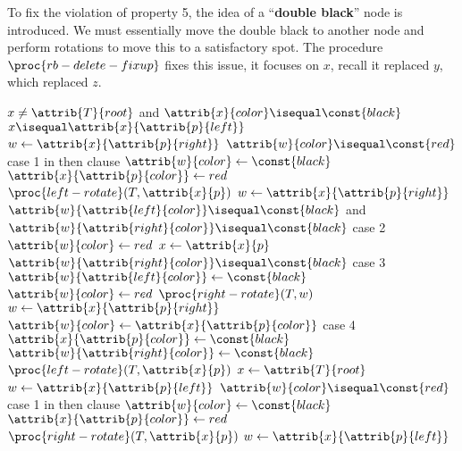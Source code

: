\documentclass{article}
\begin{document}
To fix the violation of property 5, the idea of a ``\textbf{double black}'' node is introduced. We must essentially move the double black to another node and perform rotations to move this to a satisfactory spot. The procedure $\proc{rb-delete-fixup}$ fixes this issue, it focuses on $x$, recall it replaced $y$, which replaced $z$.

\begin{codebox}
\li \While $x \neq \attrib{T}{root}$ and $\attrib{x}{color} \isequal \const{black}$
\li \Do
        \If $x \isequal \attrib{x}{\attrib{p}{left}}$
\li     \Then
            $w \gets{\attrib{x}{\attrib{p}{right}}}$
\li         \If $\attrib{w}{color} \isequal \const{red}$ \Comment case 1 in then clause
\li         \Then
                $\attrib{w}{color} \gets{\const{black}}$
\li             $\attrib{x}{\attrib{p}{color}} \gets{red }$
\li             $\proc{left-rotate}(T, \attrib{x}{p})$
\li             $w \gets{\attrib{x}{\attrib{p}{right}}}$
            \End
\li         \If $\attrib{w}{\attrib{left}{color}} \isequal \const{black}$ and $\attrib{w}{\attrib{right}{color}} \isequal \const{black}$ \Comment case 2
\li         \Then
                $\attrib{w}{color} \gets{red}$
\li             $x \gets{\attrib{x}{p}}$
\li         \Else
\li             \If $\attrib{w}{\attrib{right}{color}} \isequal \const{black}$ \Comment case 3
\li             \Then
                    $\attrib{w}{\attrib{left}{color}} \gets{\const{black}}$
\li                 $\attrib{w}{color} \gets{red}$
\li                 $\proc{right-rotate}(T, w)$
\li                 $w \gets{\attrib{x}{\attrib{p}{right}}}$
                \End
\li             $\attrib{w}{color} \gets{\attrib{x}{\attrib{p}{color}}}$ \Comment case 4
\li             $\attrib{x}{\attrib{p}{color}} \gets{\const{black}}$
\li             $\attrib{w}{\attrib{right}{color}} \gets{\const{black}}$
\li             $\proc{left-rotate}(T, \attrib{x}{p})$
\li             $x \gets{\attrib{T}{root}}$
            \End
\li     \Else
\li         $w \gets{\attrib{x}{\attrib{p}{left}}}$
\li         \If $\attrib{w}{color} \isequal \const{red}$ \Comment case 1 in then clause
\li         \Then
                $\attrib{w}{color} \gets{\const{black}}$
\li             $\attrib{x}{\attrib{p}{color}} \gets{red }$
\li             $\proc{right-rotate}(T, \attrib{x}{p})$
\li             $w \gets{\attrib{x}{\attrib{p}{left}}}$

\end{codebox}
\end{document}
